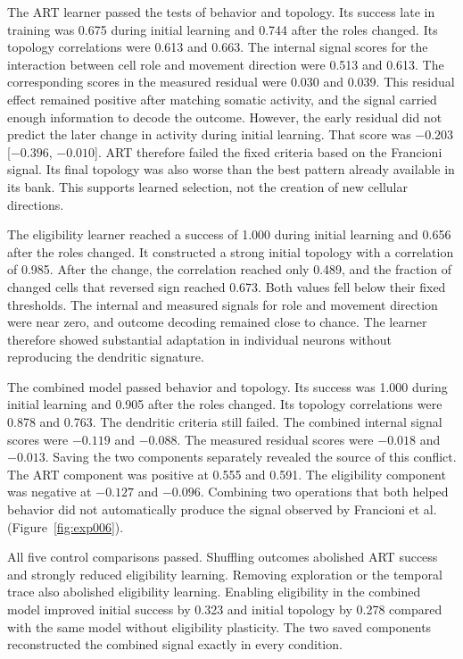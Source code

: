 \documentclass[11pt]{article}
\begin{document}
The ART learner passed the tests of behavior and topology. Its success late in training was 0.675 during initial learning and 0.744 after the roles changed. Its topology correlations were 0.613 and 0.663. The internal signal scores for the interaction between cell role and movement direction were 0.513 and 0.613. The corresponding scores in the measured residual were 0.030 and 0.039. This residual effect remained positive after matching somatic activity, and the signal carried enough information to decode the outcome. However, the early residual did not predict the later change in activity during initial learning. That score was $-0.203$ [$-0.396$, $-0.010$]. ART therefore failed the fixed criteria based on the Francioni signal. Its final topology was also worse than the best pattern already available in its bank. This supports learned selection, not the creation of new cellular directions.

The eligibility learner reached a success of 1.000 during initial learning and 0.656 after the roles changed. It constructed a strong initial topology with a correlation of 0.985. After the change, the correlation reached only 0.489, and the fraction of changed cells that reversed sign reached 0.673. Both values fell below their fixed thresholds. The internal and measured signals for role and movement direction were near zero, and outcome decoding remained close to chance. The learner therefore showed substantial adaptation in individual neurons without reproducing the dendritic signature.

The combined model passed behavior and topology. Its success was 1.000 during initial learning and 0.905 after the roles changed. Its topology correlations were 0.878 and 0.763. The dendritic criteria still failed. The combined internal signal scores were $-0.119$ and $-0.088$. The measured residual scores were $-0.018$ and $-0.013$. Saving the two components separately revealed the source of this conflict. The ART component was positive at 0.555 and 0.591. The eligibility component was negative at $-0.127$ and $-0.096$. Combining two operations that both helped behavior did not automatically produce the signal observed by Francioni et al. (Figure~\ref{fig:exp006}).

All five control comparisons passed. Shuffling outcomes abolished ART success and strongly reduced eligibility learning. Removing exploration or the temporal trace also abolished eligibility learning. Enabling eligibility in the combined model improved initial success by 0.323 and initial topology by 0.278 compared with the same model without eligibility plasticity. The two saved components reconstructed the combined signal exactly in every condition.
\end{document}
